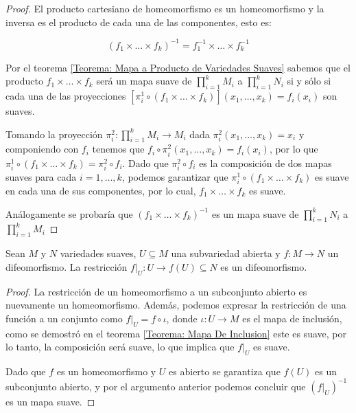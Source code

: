 \begin{proof}
  El producto cartesiano de homeomorfismo es un homeomorfismo y la inversa es el producto de cada una de las componentes, esto es:
  
  \[
    (f_1 \times \dots \times f_k)^{-1} = f_1^{-1} \times \dots \times f_k^{-1} 
  \]

  Por el teorema \ref{Teorema: Mapa a Producto de Variedades Suaves} sabemos que el producto $f_1 \times \dots \times f_k$ será un mapa suave de $\prod_{i=1}^{k} M_i$ a $\prod_{i=1}^k N_i$ si y sólo si cada una de las proyecciones $[\pi_{i}^{1} \circ (f_1 \times \dots \times f_k)](x_1,\dots,x_k) = f_i(x_i)$ son suaves.

  Tomando la proyección $\pi_{i}^2: \prod_{i=1}^k M_i \to M_i$ dada $\pi_{i}^{2}(x_1,\dots,x_k) = x_i$ y componiendo con $f_i$ tenemos que $f_i \circ \pi_{i}^2 (x_1, \dots, x_k) = f_i(x_i)$, por lo que $\pi_i^1 \circ (f_1 \times \dots \times f_k) = \pi_i^2 \circ f_i$. Dado que $\pi_i^{2} \circ f_i$ es la composición de dos mapas suaves para cada $i=1,\dots,k$, podemos garantizar que $\pi_i^1 \circ (f_1 \times \dots \times f_k)$ es suave en cada una de sus componentes, por lo cual, $f_1 \times \dots \times f_k$ es suave.

  Análogamente se probaría que $(f_1 \times \dots \times f_k)^{-1}$ es un mapa suave de $\prod_{i=1}^k N_i$ a $\prod_{i=1}^k M_i$ 
\end{proof}

\begin{theorem}
  Sean $M$ y $N$ variedades suaves, $U \subseteq M$ una subvariedad abierta y $f: M \to N$ un difeomorfismo. La restricción $f|_{U}: U \to f(U) \subseteq N$ es un difeomorfismo.
\end{theorem}

\begin{proof}
  La restricción de un homeomorfismo a un subconjunto abierto es nuevamente un homeomorfismo. Además, podemos expresar la restricción de una función a un conjunto como $f|_U = f \circ \iota$, donde $\iota: U \to M$ es el mapa de inclusión, como se demostró en el teorema \ref{Teorema: Mapa De Inclusion} este es suave, por lo tanto, la composición será suave, lo que implica que $f|_U$ es suave.

  Dado que $f$ es un homeomorfismo y $U$ es abierto se garantiza que $f(U)$ es un subconjunto abierto, y por el argumento anterior podemos concluir que $(f|_U)^{-1}$ es un mapa suave.
\end{proof}

